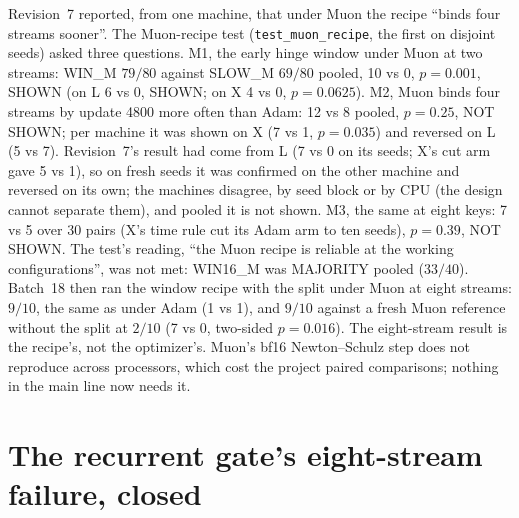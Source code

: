 \documentclass[11pt]{article}
\newcommand{\arm}[1]{\textsf{#1}}
\begin{document}
Revision~7 reported, from one machine, that under Muon the recipe ``binds four streams sooner''. The Muon-recipe test (\texttt{test\_muon\_recipe}, the first on disjoint seeds) asked three questions. M1, the early hinge window under Muon at two streams: \arm{WIN\_M} $79/80$ against \arm{SLOW\_M} $69/80$ pooled, 10 vs 0, $p = 0.001$, SHOWN (on L 6 vs 0, SHOWN; on X 4 vs 0, $p = 0.0625$). M2, Muon binds four streams by update 4800 more often than Adam: 12 vs 8 pooled, $p = 0.25$, NOT SHOWN; per machine it was shown on X (7 vs 1, $p = 0.035$) and reversed on L (5 vs 7). Revision~7's result had come from L (7 vs 0 on its seeds; X's cut arm gave 5 vs 1), so on fresh seeds it was confirmed on the other machine and reversed on its own; the machines disagree, by seed block or by CPU (the design cannot separate them), and pooled it is not shown. M3, the same at eight keys: 7 vs 5 over 30 pairs (X's time rule cut its Adam arm to ten seeds), $p = 0.39$, NOT SHOWN. The test's reading, ``the Muon recipe is reliable at the working configurations'', was not met: \arm{WIN16\_M} was MAJORITY pooled ($33/40$). Batch~18 then ran the window recipe with the split under Muon at eight streams: $9/10$, the same as under Adam (1 vs 1), and $9/10$ against a fresh Muon reference without the split at $2/10$ (7 vs 0, two-sided $p = 0.016$). The eight-stream result is the recipe's, not the optimizer's. Muon's bf16 Newton--Schulz step does not reproduce across processors, which cost the project paired comparisons; nothing in the main line now needs it.

\section{The recurrent gate's eight-stream failure, closed}
\label{sec:recurrent}
\end{document}
